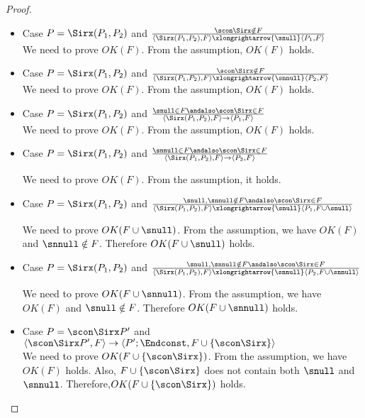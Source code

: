 \begin{proof}
\begin{itemize}
    \item Case \( P = \Sirx(P_1,P_2)\) and \( \frac{\scon\Sirx \notin F}
      { \langle \Sirx(P_1, P_2), F \rangle
      \xlongrightarrow{\snull} \langle P_1, F \rangle } \) \\
      We need to prove \( OK(F)\). From the assumption, \(OK(F)\) holds.

    \item Case \( P = \Sirx(P_1,P_2)\) and \( \frac{\scon\Sirx \notin F}
      { \langle \Sirx(P_1, P_2), F \rangle
      \xlongrightarrow{\snnull} \langle P_2, F \rangle } \) \\
      We need to prove \( OK(F)\). From the assumption, \(OK(F)\) holds.

    \item Case \( P = \Sirx(P_1,P_2)\) and \( \frac{ \snull \in F \andalso \scon\Sirx \in F}
      { \langle \Sirx(P_1, P_2), F \rangle
      \rightarrow \langle P_1, F \rangle } \) \\
      We need to prove \( OK(F)\). From the assumption, \(OK(F)\) holds.

    \item Case \( P = \Sirx(P_1,P_2)\) and \( \frac{\snnull \in F
      \andalso \scon\Sirx \in F} { \langle \Sirx(P_1, P_2), F \rangle
      \rightarrow \langle P_2, F \rangle } \)
      
      We need to prove \( OK(F)\). From the assumption, it holds.

    \item Case \( P = \Sirx(P_1,P_2)\) and \( \frac{\snull, \snnull \notin F
      \andalso \scon\Sirx \in F} { \langle \Sirx(P_1, P_2), F \rangle
      \xlongrightarrow{\snull} \langle P_1, F\cup{\snull} \rangle } \)
      
      We need to prove \( OK(F\cup{\snull})\). From the assumption, we
      have \(OK(F)\) and \(\snnull \notin F\). Therefore
      \(OK(F\cup{\snull})\) holds.

    \item Case \( P = \Sirx(P_1,P_2)\) and \( \frac{\snull, \snnull \notin F
      \andalso \scon\Sirx \in F} { \langle \Sirx(P_1, P_2), F \rangle
      \xlongrightarrow{\snnull} \langle P_2, F\cup{\snnull} \rangle } \)
      
      We need to prove \( OK(F\cup{\snnull})\). From the assumption, we
      have \(OK(F)\) and \(\snull \notin F\). Therefore
      \(OK(F\cup{\snnull})\) holds.

    \item Case \( P = \scon\Sirx P'\) and \(  \langle \scon\Sirx
      P', F \rangle \rightarrow \langle P';\Endconst, F\cup\{\scon\Sirx\} \rangle \) \\
      We need to prove \( OK(F\cup\{\scon\Sirx\})\). From the
      assumption, we have \(OK(F)\) holds. Also,
      \(F\cup\{\scon\Sirx\}\) does not contain both \(\snull\) and \(
      \snnull\). Therefore,\( OK(F\cup\{ \scon\Sirx\})\) holds.


\end{itemize}
\end{proof}
